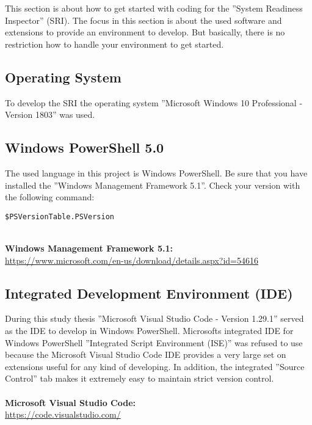 
\thispagestyle{plain}
\renewcommand\section{\stdsection}
\setcounter{section}{2}
This section is about how to get started with coding for the ''System Readiness Inspector'' (SRI). The focus in this section is about the used software and extensions to provide an environment to develop. But basically, there is no restriction how to handle your environment to get started.

\subsection{Operating System}
To develop the SRI the operating system ''Microsoft Windows 10 Professional - Version 1803'' was used.

\subsection{Windows PowerShell 5.0}
The used language in this project is Windows PowerShell. Be sure that you have installed the ''Windows Management Framework 5.1''. Check your version with the following command:

\begin{lstlisting}
$PSVersionTable.PSVersion
\end{lstlisting}
\ \\
\textbf{Windows Management Framework 5.1:} 
\\
\url{https://www.microsoft.com/en-us/download/details.aspx?id=54616}
\\


\subsection{Integrated Development Environment (IDE)}
During this study thesis ''Microsoft Visual Studio Code - Version 1.29.1'' served as the IDE to develop in Windows PowerShell. Microsofts integrated IDE for Windows PowerShell ''Integrated Script Environment (ISE)'' was refused to use because the Microsoft Visual Studio Code IDE provides a very large set on extensions useful for any kind of developing. In addition, the integrated ''Source Control'' tab makes it extremely easy to maintain strict version control. 
\\\\
\textbf{Microsoft Visual Studio Code:} 
\\
\url{https://code.visualstudio.com/}

